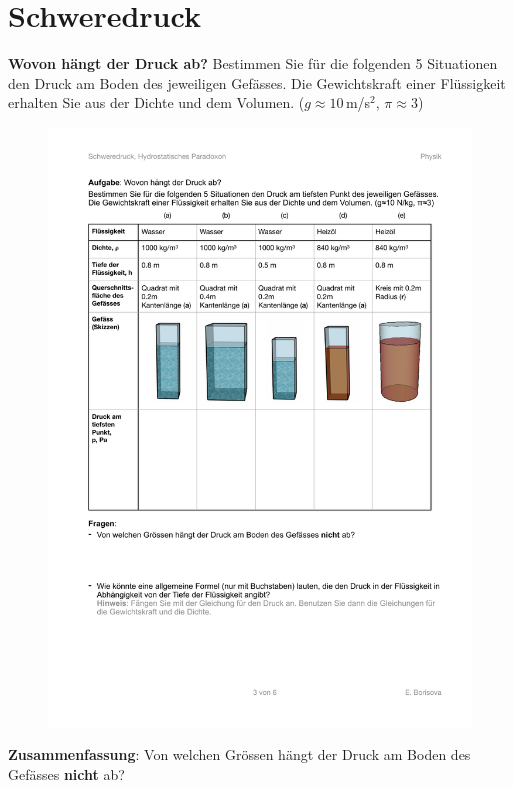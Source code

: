\documentclass[11pt]{article}
\begin{document}
\newpage

\section*{Schweredruck}

\textbf{Wovon hängt der Druck ab?} Bestimmen Sie für die folgenden 5 Situationen den Druck am Boden des jeweiligen Gefässes. Die Gewichtskraft einer Flüssigkeit erhalten Sie aus der Dichte und dem Volumen. ($g\approx 10\,$m/s$^2$, $\pi \approx 3$)

\begin{figure}[h!]
    \centering
    \includegraphics[width=\textwidth]{images/03_Dichte_Aufgabe.pdf}
    \label{Dichte}
\end{figure}

\vfill
\textbf{Zusammenfassung}: Von welchen Grössen hängt der Druck am Boden des Gefässes \textbf{nicht} ab? \vspace{2cm}
\end{document}

